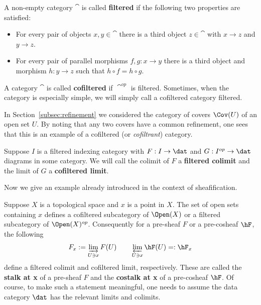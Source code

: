 \begin{defn}
	A non-empty category $\cat$ is called \textbf{filtered} if the following two properties are satisfied: 
	\begin{itemize}
		\item For every pair of objects $x, y\in \cat$ there is a third object $z\in \cat$ with $x\to z$ and $y\to z$.
		\item For every pair of parallel morphisms $f,g:x\to y$ there is a third object and morphism $h:y\to z$ such that $h\circ f=h\circ g$.
	\end{itemize}
	A category $\cat$ is called \textbf{cofiltered} if $\cat^{op}$ is filtered. Sometimes, when the category is especially simple, we will simply call a cofiltered category filtered.
\end{defn}

\begin{ex}
In Section~\ref{subsec:refinement} we considered the category of covers $\Cov(U)$ of an open set $U$. By noting that any two covers have a common refinement, one sees that this is an example of a cofiltered (or \emph{cofiltrant}) category.
\end{ex}

\begin{defn}
	Suppose $I$ is a filtered indexing category with $F:I\to\dat$ and $G:I^{op}\to\dat$ diagrams in some category. We will call the colimit of $F$ a \textbf{filtered colimit} and the limit of $G$ a \textbf{cofiltered limit}.
\end{defn}

Now we give an example already introduced in the context of sheafification.
\begin{ex}[(Co)Stalks]
	Suppose $X$ is a topological space and $x$ is a point in $X$. The set of open sets containing $x$ defines a cofiltered subcategory of $\Open(X)$ or a filtered subcategory of $\Open(X)^{op}$. Consequently for a pre-sheaf $F$ or a pre-cosheaf $\hF$, the following
	\[
	F_x:=\varinjlim_{U\ni x} F(U) \qquad \varprojlim_{U\ni x}\hF(U)=:\hF_x
	\]
	define a filtered colimit and cofiltered limit, respectively. These are called the \textbf{stalk at x} of a pre-sheaf $F$ and the \textbf{costalk at x} of a pre-cosheaf $\hF$. Of course, to make such a statement meaningful, one needs to assume the data category $\dat$ has the relevant limits and colimits.
\end{ex}

